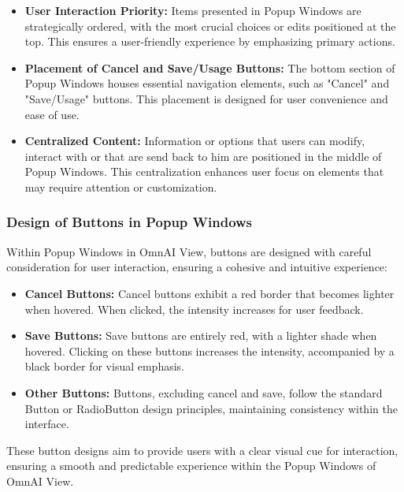 \documentclass[]{scrreprt}
\begin{document}
\begin{itemize}
\begin{itemize}
    \item \textbf{User Interaction Priority:} Items presented in Popup Windows are strategically ordered, with the most crucial choices or edits positioned at the top. This ensures a user-friendly experience by emphasizing primary actions.
    
    \item \textbf{Placement of Cancel and Save/Usage Buttons:} The bottom section of Popup Windows houses essential navigation elements, such as "Cancel" and "Save/Usage" buttons. This placement is designed for user convenience and ease of use.
    
    \item \textbf{Centralized Content:} Information or options that users can modify, interact with or that are send back to him are positioned in the middle of Popup Windows. This centralization enhances user focus on elements that may require attention or customization.
\end{itemize}

\subsubsection{Design of Buttons in Popup Windows}

Within Popup Windows in OmnAI View, buttons are designed with careful consideration for user interaction, ensuring a cohesive and intuitive experience:

\begin{itemize}
    \item \textbf{Cancel Buttons:} Cancel buttons exhibit a red border that becomes lighter when hovered. When clicked, the intensity increases for user feedback.
    
    \item \textbf{Save Buttons:} Save buttons are entirely red, with a lighter shade when hovered. Clicking on these buttons increases the intensity, accompanied by a black border for visual emphasis.
    
    \item \textbf{Other Buttons:} Buttons, excluding cancel and save, follow the standard Button or RadioButton design principles, maintaining consistency within the interface.
\end{itemize}

These button designs aim to provide users with a clear visual cue for interaction, ensuring a smooth and predictable experience within the Popup Windows of OmnAI View.


\end{itemize}
\end{document}
